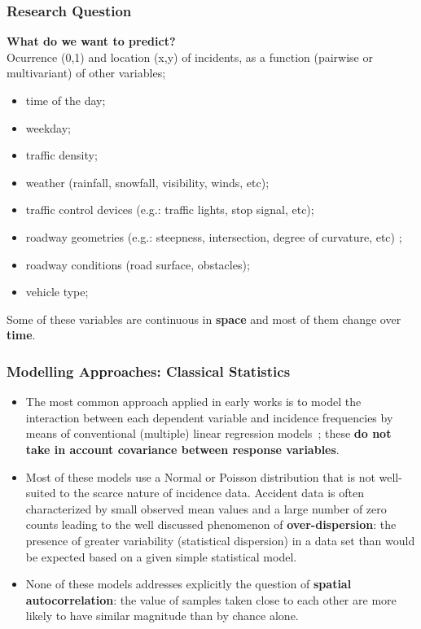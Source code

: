 \documentclass[hyperref={pdfpagelabels=true}]{beamer}
\begin{document}
\begin{frame}
\frametitle{Research Question}
\textbf{ What do we want to predict?}\\
Ocurrence (0,1) and location (x,y) of incidents, as a function (pairwise or multivariant) of other variables;
\small{
\begin{itemize}
\item time of the day;
\item weekday;
\item traffic density;
\item weather (rainfall, snowfall, visibility, winds, etc);
\item traffic control devices (e.g.: traffic lights, stop signal, etc);
\item roadway geometries (e.g.: steepness, intersection, degree of curvature, etc) 
;
\item roadway conditions (road surface, obstacles);
\item vehicle type;
\end{itemize}
}
Some of these variables are continuous in \textbf{space} and most of them change over \textbf{time}.\\
\end{frame}

\begin{frame}
\frametitle{Modelling Approaches: Classical Statistics}
\begin{itemize}
\item<1-> The most common approach applied in early works is to model the interaction between each dependent variable and incidence frequencies by means of conventional (multiple) linear regression models~\cite{bayesian}; these \textbf{do not take in account covariance between response variables}. 
\item<2-> Most of these models use a Normal or Poisson distribution that is not well-suited to the scarce nature of incidence data. Accident data is often characterized by small observed mean values and a large number of zero counts leading to the well discussed phenomenon of \textbf{over-dispersion}: the presence of greater variability (statistical dispersion) in a data set than would be expected based on a given simple statistical model.%
\item<3-> None of these models addresses explicitly the question of \textbf{spatial autocorrelation}: the value of samples taken close to each other are more likely to have similar magnitude than by chance alone.
\end{itemize}
\end{frame}
\end{document}

